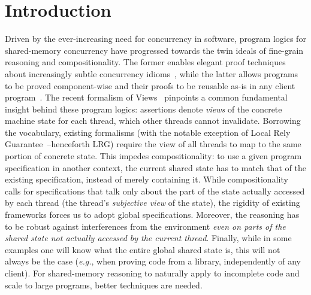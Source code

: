 \section{Introduction}


Driven by the ever-increasing need for concurrency in software,
program logics for shared-memory concurrency have progressed towards
the twin ideals of fine-grain reasoning and compositionality. The
former enables elegant proof techniques about increasingly subtle
concurrency idioms~\cite{vv06popl,vv07msc,todo}, while the latter
allows programs to be proved component-wise and their proofs to be
reusable as-is in any client
program~\cite{csl-tcs,cap-ecoop10,icap}.
The recent formalism of Views~\cite{views} pinpoints a common
fundamental insight behind these program logics: assertions denote
\emph{views} of the concrete machine state for each thread, which
other threads cannot invalidate. Borrowing the vocabulary, existing
formalisms (with the notable exception of Local Rely
Guarantee~\cite{lrg}--henceforth LRG) require the view of all threads
to map to the same portion of concrete state. This impedes
compositionality: to use a given program specification in another
context, the current shared state has to match that of the existing
specification, instead of merely containing it.  While
compositionality calls for specifications that talk only about the
part of the state actually accessed by each thread (the thread's
\emph{subjective view} of the state), the rigidity of existing
frameworks forces us to adopt global specifications. Moreover, the
reasoning has to be robust against interferences from the environment
\emph{even on parts of the shared state not actually accessed by the
  current thread}. Finally, while in some examples one will know what
the entire global shared state is, this will not always be the case
(\textit{e.g.}, when proving code from a library, independently of any
client). For shared-memory reasoning to naturally apply to incomplete
code and scale to large programs, better techniques are needed.

